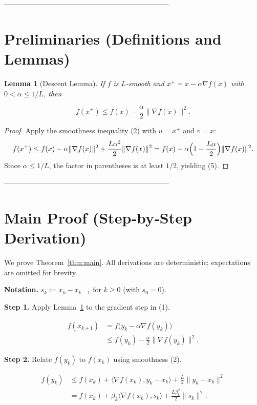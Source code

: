 \documentclass[11pt]{article}
\newtheorem{lemma}{Lemma}
\newcommand{\grad}{\nabla}
\begin{document}
---------------------------------------------------------------------

\section*{Preliminaries (Definitions and Lemmas)}
\begin{lemma}[Descent Lemma]\label{lem:descent}
If \(f\) is \(L\)-smooth and \(x^{+}=x-\alpha\grad f(x)\) with
\(0<\alpha\le 1/L\), then  

\[
f(x^{+})\le f(x)-\frac{\alpha}{2}\bigl\|\grad f(x)\bigr\|^{2}.
\tag{5}
\]
\end{lemma}
\begin{proof}
Apply the smoothness inequality (2) with \(u=x^{+}\) and \(v=x\):
\[
f(x^{+})\le f(x)-\alpha\|\grad f(x)\|^{2}
+\frac{L\alpha^{2}}{2}\|\grad f(x)\|^{2}
=f(x)-\alpha\Bigl(1-\frac{L\alpha}{2}\Bigr)\|\grad f(x)\|^{2}.
\]
Since \(\alpha\le 1/L\), the factor in parentheses is at least \(1/2\), yielding (5).
\end{proof}

---------------------------------------------------------------------

\section*{Main Proof (Step‑by‑Step Derivation)}
We prove Theorem~\ref{thm:main}.  
All derivations are deterministic; expectations are omitted for brevity.

\medskip
\noindent\textbf{Notation.}  
\(s_k:=x_k-x_{k-1}\) for \(k\ge0\) (with \(s_0=0\)).  

\medskip
\noindent\textbf{Step 1.}  Apply Lemma~\ref{lem:descent} to the gradient step in (1).  

\[
\begin{aligned}
f(x_{k+1})
&= f\bigl(y_k-\alpha\grad f(y_k)\bigr)\\
&\le f(y_k)-\frac{\alpha}{2}\bigl\|\grad f(y_k)\bigr\|^{2}.
\tag{6}
\end{aligned}
\]

\noindent\textbf{Step 2.}  Relate \(f(y_k)\) to \(f(x_k)\) using smoothness (2).  

\[
\begin{aligned}
f(y_k)
&\le f(x_k)+\langle\grad f(x_k),y_k-x_k\rangle
      +\frac{L}{2}\|y_k-x_k\|^{2}\\
&= f(x_k)+\beta_k\langle\grad f(x_k),s_k\rangle
      +\frac{L\beta_k^{2}}{2}\|s_k\|^{2}.
\tag{7}
\end{aligned}
\]
\end{document}
